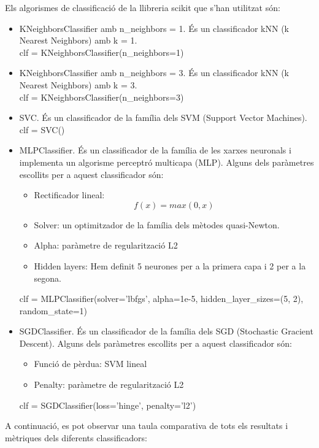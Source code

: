 \documentclass{article} %
\begin{document}
{	Els algorismes de classificació de la llibreria scikit que s'han utilitzat són:
	\begin{itemize}
		\item {
			KNeighborsClassifier amb n\_neighbors = 1. És un classificador kNN (k Nearest Neighbors) amb k = 1. \\
			{\selectfont\small
				clf = KNeighborsClassifier(n\_neighbors=1)
			}
		}
		\item {
			KNeighborsClassifier amb n\_neighbors = 3. És un classificador kNN (k Nearest Neighbors) amb k = 3. \\
			{\selectfont\small
				clf = KNeighborsClassifier(n\_neighbors=3)
			}
		}
		\item {
			SVC. És un classificador de la família dels SVM (Support Vector Machines). \\
			{\selectfont\small
				clf = SVC()
			}
		}
		\item {
			MLPClassifier. És un classificador de la família de les xarxes neuronals i implementa un algorisme perceptró multicapa (MLP). Alguns dels paràmetres escollits per a aquest classificador són:
			{
			\begin{itemize}
				\item Rectificador lineal: \[f(x) = max(0, x)\]
				\item Solver: un optimitzador de la família dels mètodes quasi-Newton.
				\item Alpha: paràmetre de regularització L2
				\item Hidden layers: Hem definit 5 neurones per a la primera capa i 2 per a la segona.
			\end{itemize}
			}
			{\selectfont\small
				clf = MLPClassifier(solver='lbfgs', alpha=1e-5, hidden\_layer\_sizes=(5, 2), random\_state=1)
			}
		}
		\item {
			SGDClassifier. És un classificador de la família dels SGD (Stochastic Gracient Descent).  Alguns dels paràmetres escollits per a aquest classificador són:
			{
			\begin{itemize}
				\item Funció de pèrdua: SVM lineal
				\item Penalty: paràmetre de regularització L2
			\end{itemize}
			}
			{\selectfont\small
				clf = SGDClassifier(loss='hinge', penalty='l2')
			}
		}
	\end{itemize}

	A continuació, es pot observar una taula comparativa de tots els resultats i mètriques dels diferents classificadors: \\

}
\end{document}
